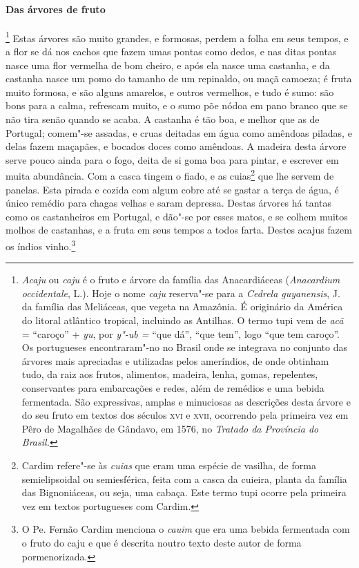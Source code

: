\begin{linenumbers}
\paragraph{Das árvores de fruto}\quad
{}\footnote{ \textit{Acaju} ou \textit{caju} é
o fruto e árvore da família das Anacardiáceas (\textit{Anacardium
occidentale}, L.). Hoje o nome \textit{caju} reserva"-se para a
\textit{Cedrela guyanensis}, J. da família das Meliáceas, que vegeta
na Amazônia. É originário da América do litoral atlântico tropical,
incluindo as Antilhas. O termo tupi vem de \textit{acã} = ``caroço'' +
\textit{yu}, por \textit{y"-ub =} ``que dá'', ``que tem'', logo ``que tem
caroço''. Os portugueses encontraram"-no no Brasil onde se integrava no
conjunto das árvores mais apreciadas e utilizadas pelos ameríndios, de
onde obtinham tudo, da raiz aos frutos, alimentos, madeira, lenha,
gomas, repelentes, conservantes para embarcações e redes, além de
remédios e uma bebida fermentada. São expressivas, amplas e minuciosas
as descrições desta árvore e do seu fruto em textos dos séculos \textsc{xvi} e
\textsc{xvii}, ocorrendo pela primeira vez em Pêro de Magalhães de Gândavo, em 1576,
no \textit{Tratado da Província do Brasil.}} Estas árvores
são muito grandes, e formosas, perdem a folha em seus tempos, e a flor
se dá nos cachos que fazem umas pontas como dedos, e nas ditas pontas
nasce uma flor vermelha de bom cheiro, e após ela nasce uma castanha, e
da castanha nasce um pomo do tamanho de um repinaldo, ou maçã camoeza;
é fruta muito formosa, e são alguns amarelos, e outros vermelhos, e
tudo é sumo: são bons para a calma, refrescam muito, e o sumo põe nódoa
em pano branco que se não tira senão quando se acaba. A castanha é tão
boa, e melhor que as de Portugal; comem"-se assadas, e cruas deitadas em
água como amêndoas piladas, e delas fazem maçapães, e bocados doces
como amêndoas. A madeira desta árvore serve pouco ainda para o fogo,
deita de si goma boa para pintar, e escrever em muita abundância. Com a
casca tingem o fiado, e as cuias\footnote{ Cardim refere"-se às
\textit{cuias} que eram uma espécie de vasilha, de forma
semielipsoidal ou semiesférica, feita com a casca da cuieira, planta
da família das Bignoniáceas, ou seja, uma cabaça. Este termo tupi
ocorre pela primeira vez em textos portugueses com Cardim.} que lhe
servem de panelas. Esta pirada e cozida com algum cobre até se gastar a
terça de água, é único remédio para chagas velhas e saram depressa.
Destas árvores há tantas como os castanheiros em Portugal, e dão"-se por
esses matos, e se colhem muitos molhos de castanhas, e a fruta em seus
tempos a todos farta. Destes acajus fazem os índios vinho.\footnote{ O
Pe. Fernão Cardim menciona o \textit{cauim} que era uma bebida
fermentada com o fruto do caju e que é descrita noutro texto deste
autor de forma pormenorizada.} 


\end{linenumbers}
